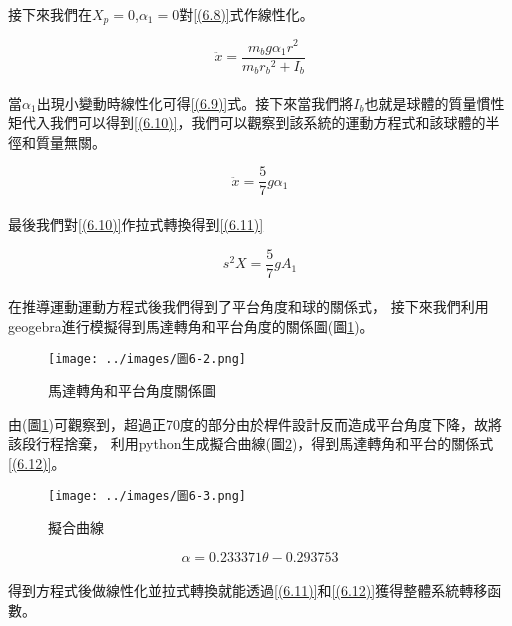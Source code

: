 接下來我們在\(X_p=0\),\(\alpha_1=0\)對\ref{(6.8)}式作線性化。

\begin{equation}
\ddot{x}=\frac{m_b g \alpha_1 r^2}{m_b r_b{ }^2+I_b}
\label{(6.9)}
\end{equation}\\

當\(\alpha_1\)出現小變動時線性化可得\ref{(6.9)}式。接下來當我們將\(I_b\)也就是球體的質量慣性矩代入我們可以得到\ref{(6.10)}，我們可以觀察到該系統的運動方程式和該球體的半徑和質量無關。

\begin{equation}
\ddot{x}=\frac{5}{7} g \alpha_1
\label{(6.10)}
\end{equation}\\

最後我們對\ref{(6.10)}作拉式轉換得到\ref{(6.11)}

\begin{equation}
s^2 X=\frac{5}{7} g A_1
\label{(6.11)}
\end{equation}\\

在推導運動運動方程式後我們得到了平台角度和球的關係式，
接下來我們利用geogebra進行模擬得到馬達轉角和平台角度的關係圖(圖\ref{(圖 6-2)})。\\

\begin{figure}[h]
\centering
\texttt{[image: ../images/圖6-2.png]}
\caption{馬達轉角和平台角度關係圖}
\label{(圖 6-2)}
\end{figure}

由(圖\ref{(圖 6-2)})可觀察到，超過正70度的部分由於桿件設計反而造成平台角度下降，故將該段行程捨棄，
利用python生成擬合曲線(圖\ref{圖6-3})，得到馬達轉角和平台的關係式\ref{(6.12)}。\\


\begin{figure}[h]
\centering
\texttt{[image: ../images/圖6-3.png]}
\caption{擬合曲線}
\label{圖6-3}
\end{figure}

\begin{equation}
\alpha=0.233371\theta-0.293753
\label{(6.12)}
\end{equation}\\


得到方程式後做線性化並拉式轉換就能透過\ref{(6.11)}和\ref{(6.12)}獲得整體系統轉移函數。\\






